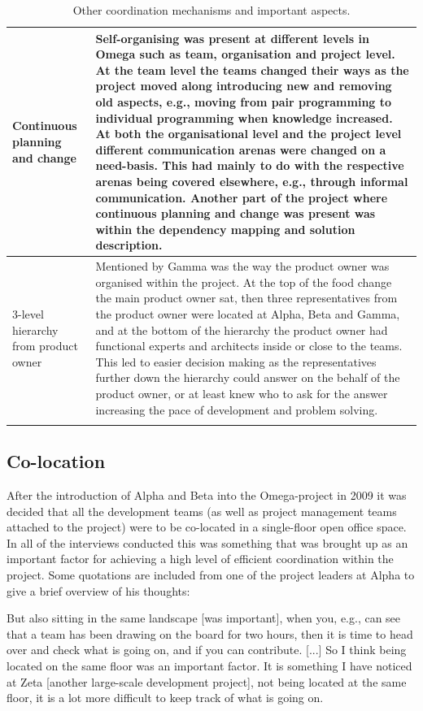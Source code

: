 \begin{center}
\begin{longtable}{| p{3.5cm} | p{8cm} |}
    Continuous planning and change & Self-organising was present at different levels in Omega such as team, organisation and project level. At the team level the teams changed their ways as the project moved along introducing new and removing old aspects, e.g., moving from pair programming to individual programming when knowledge increased. At both the organisational level and the project level different communication arenas were changed on a need-basis. This had mainly to do with the respective arenas being covered elsewhere, e.g., through informal communication. Another part of the project where continuous planning and change was present was within the dependency mapping and solution description. \\ \hline
    3-level hierarchy from product owner & Mentioned by Gamma was the way the product owner was organised within the project. At the top of the food change the main product owner sat, then three representatives from the product owner were located at Alpha, Beta and Gamma, and at the bottom of the hierarchy the product owner had functional experts and architects inside or close to the teams. This led to easier decision making as the representatives further down the hierarchy could answer on the behalf of the product owner, or at least knew who to ask for the answer increasing the pace of development and problem solving. \\ \hline

    \caption{Other coordination mechanisms and important aspects.}
    \label{ocmaia}
    \end{longtable}
\end{center}

\subsection{Co-location}

After the introduction of Alpha and Beta into the Omega-project in 2009 it was decided that all the development teams (as well as project management teams attached to the project) were to be co-located in a single-floor open office space. In all of the interviews conducted this was something that was brought up as an important factor for achieving a high level of efficient coordination within the project. Some quotations are included from one of the project leaders at Alpha to give a brief overview of his thoughts:

\begin{fancyquotes}
But also sitting in the same landscape [was important], when you, e.g., can see that a team has been drawing on the board for two hours, then it is time to head over and check what is going on, and if you can contribute. [...] So I think being located on the same floor was an important factor. It is something I have noticed at Zeta [another large-scale development project], not being located at the same floor, it is a lot more difficult to keep track of what is going on. 
\end{fancyquotes}

